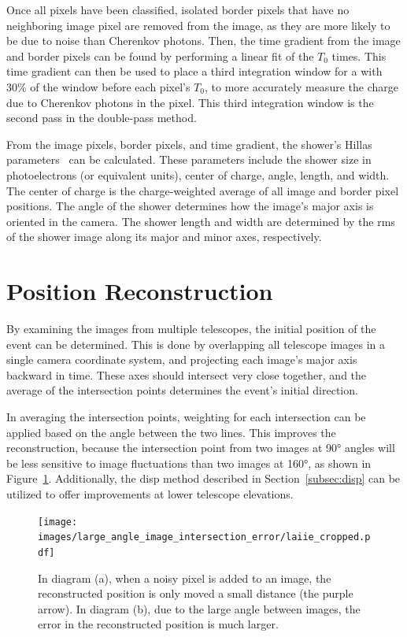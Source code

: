   Once all pixels have been classified, isolated border pixels that have no neighboring image pixel are removed from the image, as they are more likely to be due to noise than Cherenkov photons.
  Then, the time gradient from the image and border pixels can be found by performing a linear fit of the $T_{0}$ times.
  This time gradient can then be used to place a third integration window for a 
with 30\% of the window before each pixel's $T_{0}$, to more accurately measure the charge due to Cherenkov photons in the pixel.
  This third integration window is the second pass in the double-pass method.

  From the image pixels, border pixels, and time gradient, the shower's Hillas parameters~\cite{hillas_params} can be calculated.
  These parameters include the shower size in photoelectrons (or equivalent units), center of charge, angle, length, and width.
  The center of charge is the charge-weighted average of all image and border pixel positions.
  The angle of the shower determines how the image's major axis is oriented in the camera.
  The shower length and width are determined by the rms of the shower image along its major and minor axes, respectively.

\section{Position Reconstruction}\label{subsec:posrecon}
  By examining the images from multiple telescopes, the initial position of the event can be determined.
  This is done by overlapping all telescope images in a single camera coordinate system, and projecting each image's major axis backward in time.
  These axes should intersect very close together, and the average of the intersection points determines the event's initial direction.

  In averaging the intersection points, weighting for each intersection can be applied based on the angle between the two lines.
  This improves the reconstruction, because the intersection point from two images at \ang{90} angles will be less sensitive to image fluctuations than two images at \ang{160}, as shown in Figure~\ref{fig:largeintersectangle}.
  Additionally, the disp method described in Section~\ref{subsec:disp} can be utilized to offer improvements at lower telescope elevations.

  \begin{figure}[ht]
    \centering
    \texttt{[image: images/large\_angle\_image\_intersection\_error/laiie\_cropped.pdf]}
    \caption[Large Image Intersection Angles]{
      In diagram (a), when a noisy pixel is added to an image, the reconstructed position is only moved a small distance (the purple arrow).
      In diagram (b), due to the large angle between images, the error in the reconstructed position is much larger.
    }
    \label{fig:largeintersectangle}
  \end{figure}
  \FloatBarrier

